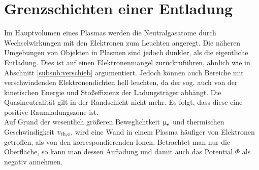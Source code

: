 %
%

  \section{Grenzschichten einer Entladung}\label{sub:rand}

    Im Hauptvolumen eines Plasmas werden die Neutralgasatome durch Wechselwirkungen mit den Elektronen zum Leuchten angeregt. Die näheren Umgebungen von Objekten in Plasmen sind jedoch dunkler, als die eigentliche Entladung. Dies ist auf einen Elektronenmangel zur\"uckruf\"uhren, ähnlich wie in Abschnitt \ref{subsub:verschieb} argumentiert. Jedoch können auch Bereiche mit verschwindenden Elektronendichten hell leuchten, da der sog.  auch von der kinetischen Energie und Stoßeffizienz der Ladungsträger abhängt. Die Quasineutralit\"at gilt in der Randschicht nicht mehr. Es folgt, dass diese eine positive Raumladungszone ist. \\
    Auf Grund der wesentlich gr\"o{\ss}eren Beweglichtkeit $\upmu_\text{e}$ und thermischen Geschwindigkeit $v_\text{th,e}$, wird eine Wand in einem Plasma h\"aufiger von Elektronen getroffen, als von den korrespondierenden Ionen. Betrachtet man nur die Oberfl\"ache, so kann man dessen Aufladung und damit auch das Potential $\Phi$ als negativ annehmen.

